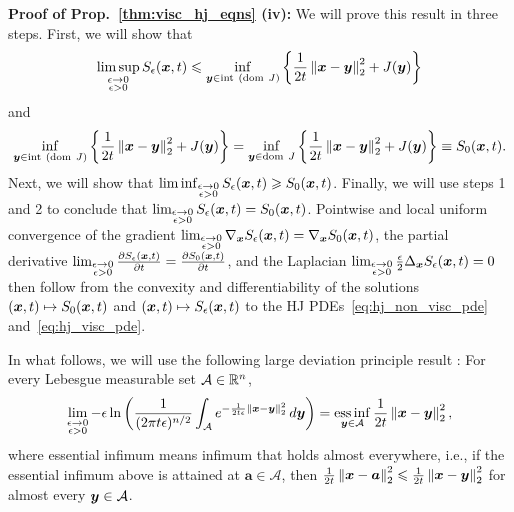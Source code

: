\textbf{Proof of Prop.~\ref{thm:visc_hj_eqns} (iv):} We will prove this result in three steps. First, we will show that 
\[
\limsup_{\substack{\epsilon\to0\\
\epsilon>0
}
}S_{\epsilon}(\boldsymbol{x},t)\leqslant\inf_{\boldsymbol{y}\in\mathrm{int~}(\mathrm{dom~} J)}\left\{ \frac{1}{2t}\left\Vert \boldsymbol{x}-\boldsymbol{y}\right\Vert _{2}^{2}+J(\boldsymbol{y})\right\} 
\]
 and 
\[
\inf_{\boldsymbol{y}\in\mathrm{int~}(\mathrm{dom~} J)}\left\{ \frac{1}{2t}\left\Vert \boldsymbol{x}-\boldsymbol{y}\right\Vert _{2}^{2}+J(\boldsymbol{y})\right\} = \inf_{\boldsymbol{y}\in\mathrm{dom~} J}\left\{ \frac{1}{2t}\left\Vert \boldsymbol{x}-\boldsymbol{y}\right\Vert _{2}^{2}+J(\boldsymbol{y})\right\} \equiv S_0(\boldsymbol{x},t).
\]
Next, we will show that $\liminf_{\substack{\epsilon\to0\\
\epsilon>0
}
}S_{\epsilon}(\boldsymbol{x},t)\geqslant S_0(\boldsymbol{x},t)$. 
Finally, we will use steps 1 and 2 to conclude that $\lim_{\substack{\epsilon\to0\\
\epsilon>0
}
}S_{\epsilon}(\boldsymbol{x},t)=S_0(\boldsymbol{x},t)$. Pointwise and local uniform convergence of the gradient $\lim_{\substack{\epsilon\to0\\
\epsilon>0
}
}\nabla_{\boldsymbol{x}}S_{\epsilon}(\boldsymbol{x},t)=\nabla_{\boldsymbol{x}}S_0(\boldsymbol{x},t)$, the partial derivative $\lim_{\substack{\epsilon\to0\\
\epsilon>0
}
}\frac{\partial S_{\epsilon}(\boldsymbol{x},t)}{\partial t}=\frac{\partial S_0(\boldsymbol{x},t)}{\partial t}$, and the Laplacian $\lim_{\substack{\epsilon\to0\\
\epsilon>0}}\frac{\epsilon}{2}\Delta_{\boldsymbol x} S_{\epsilon}(\boldsymbol{x},t)=0$ then follow from the convexity and differentiability of the solutions $(\boldsymbol{x},t)\mapsto S_0(\boldsymbol{x},t)$ and $(\boldsymbol{x},t)\mapsto S_{\epsilon}(\boldsymbol{x},t)$ to the HJ PDEs~\eqref{eq:hj_non_visc_pde} and~\eqref{eq:hj_visc_pde}.

In what follows, we will use the following large deviation principle result \citep{deuschel2001large}: For every Lebesgue measurable set $\mathcal{A} \in \mathbb{R}^n$,
\[
\lim_{\substack{\epsilon\to0\\
\epsilon>0
}
}-\epsilon\ln\left(\frac{1}{(2\pi t\epsilon)^{n/2}}\int_{\mathcal{A}}e^{-\frac{1}{2t\epsilon}\left\Vert \boldsymbol{x}-\boldsymbol{y}\right\Vert _{2}^{2}}\mathop{}\!d\boldsymbol{y}\right)=\operatorname*{ess\,inf}_{\boldsymbol{y}\in\mathcal{A}}\frac{1}{2t}\left\Vert \boldsymbol{x}-\boldsymbol{y}\right\Vert _{2}^{2},
\]
where essential infimum means infimum that holds almost everywhere, i.e., if the essential infimum above is attained at $\boldsymbol{a}\in\mathcal{A}$, then $\frac{1}{2t}\left\Vert \boldsymbol{x}-\boldsymbol{a}\right\Vert _{2}^{2}\leqslant\frac{1}{2t}\left\Vert \boldsymbol{x}-\boldsymbol{y}\right\Vert _{2}^{2}$ for almost every $\boldsymbol{y}\in\mathcal{A}$. 

